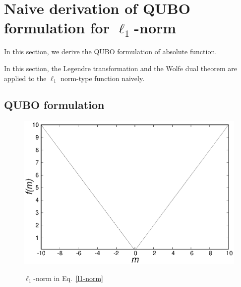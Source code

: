 \documentclass[fp,twocolumn]{jpsj3}
\begin{document}
\section{Naive derivation of QUBO formulation for $\ell_{1}$-norm} \label{Native_derivation}
In this section, we derive the QUBO formulation of absolute function.


In this section, the Legendre transformation and the Wolfe dual theorem are applied to the $\ell_{1}$ norm-type function naively. 


\subsection{QUBO formulation}


\begin{figure}[tb]
  \begin{center}
    \includegraphics[keepaspectratio,scale=0.50]{absolute.eps} \\
    \begin{minipage}{0.03\hsize}
      \vspace{2mm}
    \end{minipage}
    \caption{$\ell_{1}$-norm in Eq.~\eqref{l1-norm}}
    \label{fig:absolute}
  \end{center}
\end{figure}

\end{document}
